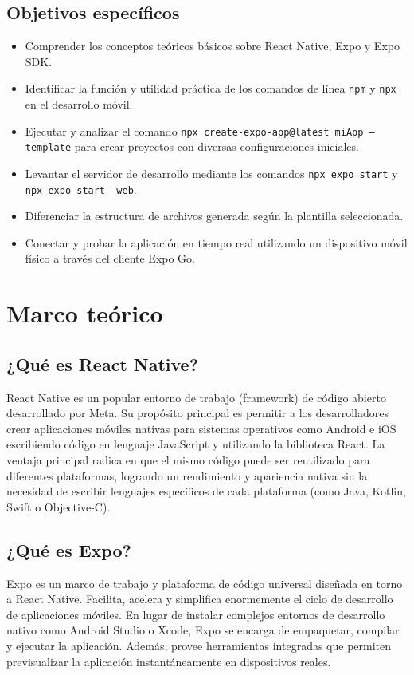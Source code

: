 \documentclass[12pt,a4paper]{article}
\begin{document}
\subsection{Objetivos específicos}
\begin{itemize}
    \item Comprender los conceptos teóricos básicos sobre React Native, Expo y Expo SDK.
    \item Identificar la función y utilidad práctica de los comandos de línea \texttt{npm} y \texttt{npx} en el desarrollo móvil.
    \item Ejecutar y analizar el comando \texttt{npx create-expo-app@latest miApp --template} para crear proyectos con diversas configuraciones iniciales.
    \item Levantar el servidor de desarrollo mediante los comandos \texttt{npx expo start} y \texttt{npx expo start --web}.
    \item Diferenciar la estructura de archivos generada según la plantilla seleccionada.
    \item Conectar y probar la aplicación en tiempo real utilizando un dispositivo móvil físico a través del cliente Expo Go.
\end{itemize}

\section{Marco teórico}

\subsection{¿Qué es React Native?}
React Native es un popular entorno de trabajo (framework) de código abierto desarrollado por Meta. Su propósito principal es permitir a los desarrolladores crear aplicaciones móviles nativas para sistemas operativos como Android e iOS escribiendo código en lenguaje JavaScript y utilizando la biblioteca React. La ventaja principal radica en que el mismo código puede ser reutilizado para diferentes plataformas, logrando un rendimiento y apariencia nativa sin la necesidad de escribir lenguajes específicos de cada plataforma (como Java, Kotlin, Swift o Objective-C).

\subsection{¿Qué es Expo?}
Expo es un marco de trabajo y plataforma de código universal diseñada en torno a React Native. Facilita, acelera y simplifica enormemente el ciclo de desarrollo de aplicaciones móviles. En lugar de instalar complejos entornos de desarrollo nativo como Android Studio o Xcode, Expo se encarga de empaquetar, compilar y ejecutar la aplicación. Además, provee herramientas integradas que permiten previsualizar la aplicación instantáneamente en dispositivos reales.
\end{document}

